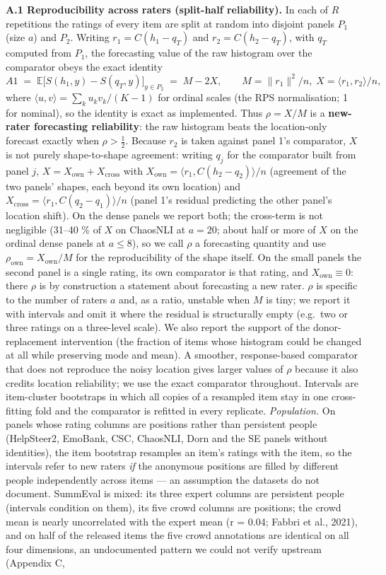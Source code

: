 \documentclass[10pt,twocolumn]{article}
\begin{document}
\textbf{A.1 Reproducibility across raters (split-half reliability).} In each of \(R\) repetitions the ratings of every item are split at random into disjoint panels \(P_1\) (size \(a\)) and \(P_2\). Writing \(r_1 = C(h_1-q_T)\) and \(r_2 = C(h_2-q_T)\), with \(q_T\) computed from \(P_1\), the forecasting value of the raw histogram over the comparator obeys the exact identity \[A1 \;=\; \mathbb E\big[S(h_1,y)-S(q_T,y)\big]_{y\in P_2} \;=\; M - 2X,\qquad M=\|r_1\|^2/n,\; X=\langle r_1,r_2\rangle/n,\] where \(\langle u,v\rangle=\sum_k u_k v_k/(K-1)\) for ordinal scales (the RPS normalisation; 1 for nominal), so the identity is exact as implemented. Thus \(\rho = X/M\) is a \textbf{new-rater forecasting reliability}: the raw histogram beats the location-only forecast exactly when \(\rho>\tfrac12\). Because \(r_2\) is taken against panel 1's comparator, \(X\) is not purely shape-to-shape agreement: writing \(q_j\) for the comparator built from panel \(j\), \(X = X_{\text{own}} + X_{\text{cross}}\) with \(X_{\text{own}}=\langle r_1, C(h_2-q_2)\rangle/n\) (agreement of the two panels' shapes, each beyond its own location) and \(X_{\text{cross}}=\langle r_1, C(q_2-q_1)\rangle/n\) (panel 1's residual predicting the other panel's location shift). On the dense panels we report both; the cross-term is not negligible (31--40 \% of \(X\) on ChaosNLI at \(a=20\); about half or more of \(X\) on the ordinal dense panels at \(a\le 8\)), so we call \(\rho\) a forecasting quantity and use \(\rho_{\text{own}}=X_{\text{own}}/M\) for the reproducibility of the shape itself. On the small panels the second panel is a single rating, its own comparator is that rating, and \(X_{\text{own}}\equiv 0\): there \(\rho\) is by construction a statement about forecasting a new rater. \(\rho\) is specific to the number of raters \(a\) and, as a ratio, unstable when \(M\) is tiny; we report it with intervals and omit it where the residual is structurally empty (e.g.~two or three ratings on a three-level scale). We also report the support of the donor-replacement intervention (the fraction of items whose histogram could be changed at all while preserving mode and mean). A smoother, response-based comparator that does not reproduce the noisy location gives larger values of \(\rho\) because it also credits location reliability; we use the exact comparator throughout. Intervals are item-cluster bootstraps in which all copies of a resampled item stay in one cross-fitting fold and the comparator is refitted in every replicate. \emph{Population.} On panels whose rating columns are positions rather than persistent people (HelpSteer2, EmoBank, CSC, ChaosNLI, Dorn and the SE panels without identities), the item bootstrap resamples an item's ratings with the item, so the intervals refer to new raters \emph{if} the anonymous positions are filled by different people independently across items --- an assumption the datasets do not document. SummEval is mixed: its three expert columns are persistent people (intervals condition on them), its five crowd columns are positions; the crowd mean is nearly uncorrelated with the expert mean (r = 0.04; Fabbri et al., 2021), and on half of the released items the five crowd annotations are identical on all four dimensions, an undocumented pattern we could not verify upstream (Appendix C, 
\end{document}
